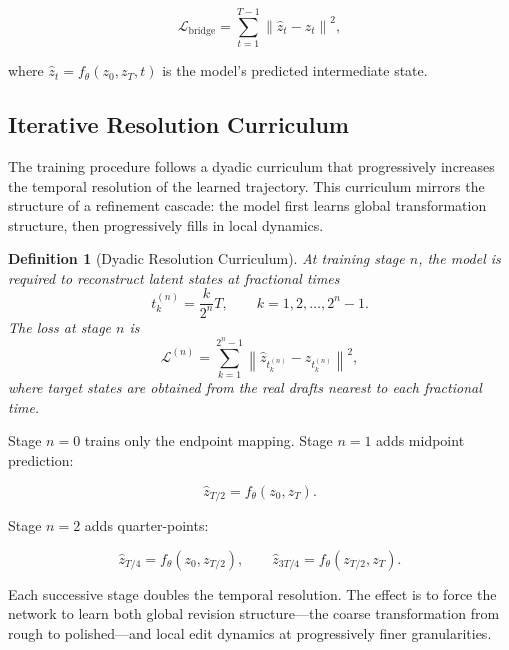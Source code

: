 \documentclass[12pt,a4paper]{article}
\theoremstyle{draftthm}
\newtheorem{definition}{Definition}[section]
\newcommand{\norm}[1]{\left\|#1\right\|}
\begin{document}
\begin{equation}
  \mathcal{L}_{\mathrm{bridge}}
  =
  \sum_{t=1}^{T-1}
  \norm{\hat{z}_t - z_t}^2,
  \label{eq:bridge-l2}
\end{equation}

where $\hat{z}_t = f_{\theta}(z_0, z_T, t)$ is the model's predicted intermediate state.

\subsection{Iterative Resolution Curriculum}

The training procedure follows a dyadic curriculum that progressively increases the temporal resolution of the learned trajectory. This curriculum mirrors the structure of a refinement cascade: the model first learns global transformation structure, then progressively fills in local dynamics.

\begin{definition}[Dyadic Resolution Curriculum]
  At training stage $n$, the model is required to reconstruct latent states at fractional times
  \begin{equation}
    t_k^{(n)} = \frac{k}{2^n} T, \qquad k = 1, 2, \dots, 2^n - 1.
  \end{equation}
  The loss at stage $n$ is
  \begin{equation}
    \mathcal{L}^{(n)}
    =
    \sum_{k=1}^{2^n - 1}
    \norm{\hat{z}_{t_k^{(n)}} - z_{t_k^{(n)}}}^2,
    \label{eq:dyadic-loss}
  \end{equation}
  where target states are obtained from the real drafts nearest to each fractional time.
\end{definition}

Stage $n=0$ trains only the endpoint mapping. Stage $n=1$ adds midpoint prediction:

\begin{equation}
  \hat{z}_{T/2} = f_{\theta}(z_0, z_T).
\end{equation}

Stage $n=2$ adds quarter-points:

\begin{equation}
  \hat{z}_{T/4} = f_{\theta}(z_0, z_{T/2}), \qquad
  \hat{z}_{3T/4} = f_{\theta}(z_{T/2}, z_T).
\end{equation}

Each successive stage doubles the temporal resolution. The effect is to force the network to learn both global revision structure---the coarse transformation from rough to polished---and local edit dynamics at progressively finer granularities.
\end{document}
